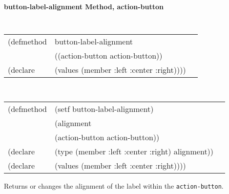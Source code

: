 {\samepage  
{\large {\bf button-label-alignment \hfill Method, action-button}}
\begin{flushright} \parbox[t]{6.125in}{
\tt
\begin{tabular}{lll}
\raggedright
(defmethod & button-label-alignment & \\
& ((action-button  action-button)) \\
(declare & (values (member :left :center :right))))
\end{tabular}
\rm

}\end{flushright}}

\begin{flushright} \parbox[t]{6.125in}{
\tt
\begin{tabular}{lll}
\raggedright
(defmethod & (setf button-label-alignment) & \\
         & (alignment \\
         & (action-button  action-button)) \\
(declare &(type (member :left :center :right)  alignment))\\
(declare & (values (member :left :center :right))))
\end{tabular}
\rm}
\end{flushright}

\begin{flushright} \parbox[t]{6.125in}{
Returns or changes the alignment of the label within the {\tt action-button}.}
\end{flushright}

%


